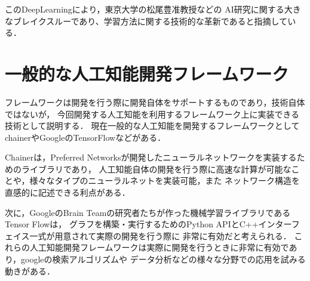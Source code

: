 このDeepLearningにより，東京大学の松尾豊准教授\cite{boom}などの
AI研究に関する大きなブレイクスルーであり、学習方法に関する技術的な革新であると指摘している．

\section{一般的な人工知能開発フレームワーク}
フレームワークは開発を行う際に開発自体をサポートするものであり，技術自体ではないが，
今回開発する人工知能を利用するフレームワーク上に実装できる技術として説明する．
現在一般的な人工知能を開発するフレームワークとしてchainerやGoogleのTensorFlowなどがある．

Chainerは，Preferred Networksが開発したニューラルネットワークを実装するためのライブラリであり，
人工知能自体の開発を行う際に高速な計算が可能なことや，様々なタイプのニューラルネットを実装可能，また
ネットワーク構造を直感的に記述できる利点がある．

次に，GoogleのBrain Teamの研究者たちが作った機械学習ライブラリであるTensor Flowは，
グラフを構築・実行するためのPython APIとC++インターフェイス一式が用意されて実際の開発を行う際に
非常に有効だと考えられる．
これらの人工知能開発フレームワークは実際に開発を行うときに非常に有効であり，googleの検索アルゴリズムや
データ分析などの様々な分野での応用を試みる動きがある．
